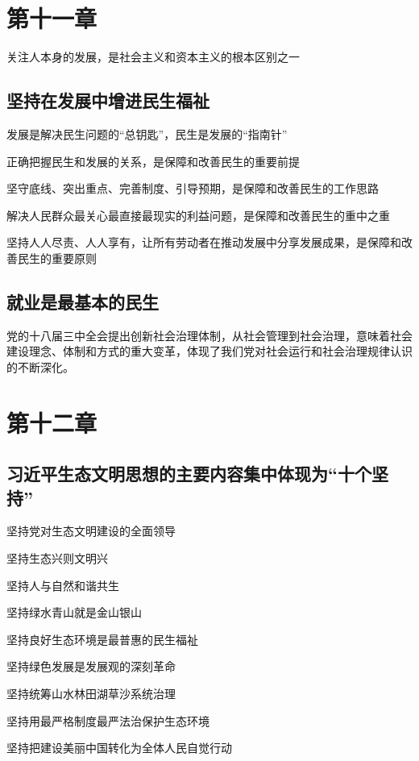 \documentclass[11pt, a4paper]{article}
\begin{document}
\section*{第十一章}

关注人本身的发展，是社会主义和资本主义的根本区别之一

\subsection*{坚持在发展中增进民生福祉}

发展是解决民生问题的“总钥匙”，民生是发展的“指南针”

正确把握民生和发展的关系，是保障和改善民生的重要前提

坚守底线、突出重点、完善制度、引导预期，是保障和改善民生的工作思路

解决人民群众最关心最直接最现实的利益问题，是保障和改善民生的重中之重

坚持人人尽责、人人享有，让所有劳动者在推动发展中分享发展成果，是保障和改善民生的重要原则

\subsection*{就业是最基本的民生}

党的十八届三中全会提出创新社会治理体制，从社会管理到社会治理，意味着社会建设理念、体制和方式的重大变革，体现了我们党对社会运行和社会治理规律认识的不断深化。

\section*{第十二章}

\subsection*{习近平生态文明思想的主要内容集中体现为“十个坚持”}

坚持党对生态文明建设的全面领导

坚持生态兴则文明兴

坚持人与自然和谐共生

坚持绿水青山就是金山银山

坚持良好生态环境是最普惠的民生福祉

坚持绿色发展是发展观的深刻革命

坚持统筹山水林田湖草沙系统治理

坚持用最严格制度最严法治保护生态环境

坚持把建设美丽中国转化为全体人民自觉行动
\end{document}

